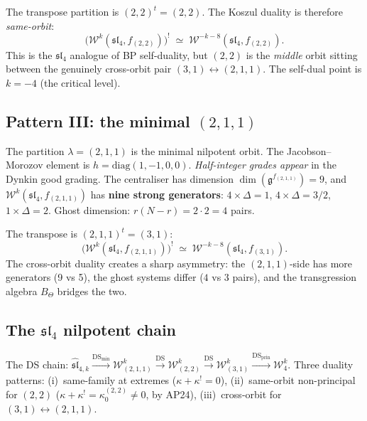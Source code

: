\documentclass[11pt]{article}
\newcommand{\cW}{\mathcal{W}}
\newcommand{\fg}{\mathfrak{g}}
\newcommand{\fsl}{\mathfrak{sl}}
\begin{document}
\begin{observation}
\label{obs:sl4-22-koszul-wn}
The transpose partition is $(2,2)^t = (2,2)$.
The Koszul duality is therefore \emph{same-orbit}:
\[
\bigl(\cW^k(\fsl_4, f_{(2,2)})\bigr)^!
\;\simeq\;
\cW^{-k-8}(\fsl_4, f_{(2,2)}).
\]
This is the $\fsl_4$ analogue of BP self-duality,
but $(2,2)$ is the \emph{middle} orbit sitting
between the genuinely cross-orbit pair $(3,1) \leftrightarrow (2,1,1)$.
The self-dual point is $k = -4$ (the critical level).
\end{observation}

\subsection{Pattern III: the minimal $(2,1,1)$}
\label{subsec:sl4-hook-211-wn}

\begin{observation}
\label{obs:sl4-211-data-wn}
The partition $\lambda = (2,1,1)$ is the minimal nilpotent orbit.
The Jacobson--Morozov element is
$h = \mathrm{diag}(1,-1,0,0)$.  \emph{Half-integer grades appear}
in the Dynkin good grading.
The centraliser has dimension $\dim(\fg^{f_{(2,1,1)}}) = 9$,
and $\cW^k(\fsl_4, f_{(2,1,1)})$ has
\textbf{nine strong generators}: $4 \times \Delta{=}1$,
$4 \times \Delta{=}3/2$, $1 \times \Delta{=}2$.
Ghost dimension: $r(N{-}r) = 2 \cdot 2 = 4$ pairs.
\end{observation}

\begin{observation}
\label{obs:sl4-211-koszul-wn}
The transpose is $(2,1,1)^t = (3,1)$:
\[
\bigl(\cW^k(\fsl_4, f_{(2,1,1)})\bigr)^!
\;\simeq\;
\cW^{-k-8}(\fsl_4, f_{(3,1)}).
\]
The cross-orbit duality creates a sharp asymmetry:
the $(2,1,1)$-side has more generators (9 vs 5),
the ghost systems differ ($4$ vs $3$ pairs),
and the transgression algebra $B_\Theta$ bridges the two.
\end{observation}

\subsection{The $\fsl_4$ nilpotent chain}
\label{subsec:sl4-chain-wn}

\begin{observation}[The $\fsl_4$ chain]
\label{obs:sl4-chain-wn}
The DS chain:
$\widehat{\fsl}_{4,k}
\xrightarrow{\mathrm{DS}_{\min}}
\cW^k_{(2,1,1)}
\xrightarrow{\mathrm{DS}}
\cW^k_{(2,2)}
\xrightarrow{\mathrm{DS}}
\cW^k_{(3,1)}
\xrightarrow{\mathrm{DS}_{\mathrm{prin}}}
\cW_4^k$.
Three duality patterns: (i)~same-family at extremes ($\kappa+\kappa^!=0$),
(ii)~same-orbit non-principal for $(2,2)$ ($\kappa+\kappa^! = \kappa_0^{(2,2)} \neq 0$, by AP24),
(iii)~cross-orbit for $(3,1)\leftrightarrow(2,1,1)$.
\end{observation}
\end{document}
